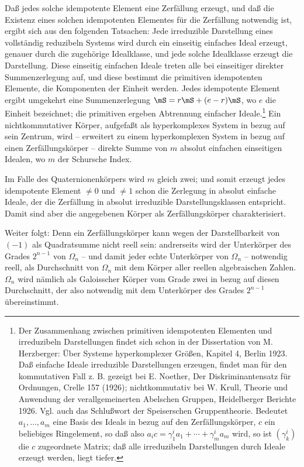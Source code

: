 Daß jedes solche idempotente Element eine Zerfällung erzeugt, und daß die Existenz eines solchen idempotenten Elementes für die Zerfällung notwendig ist, ergibt sich aus den folgenden Tatsachen: Jede irreduzible Darstellung eines vollständig reduzibeln Systems wird durch ein einseitig einfaches Ideal erzeugt, genauer durch die zugehörige Idealklasse, und jede solche Idealklasse erzeugt die Darstellung. Diese einseitig einfachen Ideale treten alle bei einseitiger direkter Summenzerlegung auf, und diese bestimmt die \guillemotright{}primitiven\guillemotleft{} idempotenten Elemente, die Komponenten der Einheit werden. Jedes idempotente Element ergibt umgekehrt eine Summenzerlegung $\mS=r\mS+(e-r)\mS$, wo $e$ die Einheit bezeichnet; die \guillemotright{}primitiven\guillemotleft{} ergeben Abtrennung einfacher Ideale.\footnote{Der Zusammenhang zwischen primitiven idempotenten Elementen und irreduzibeln Darstellungen findet sich schon in der Dissertation von M. Herzberger: Über Systeme hyperkomplexer Größen, Kapitel 4, Berlin 1923. Daß einfache Ideale irreduzible Darstellungen erzeugen, findet man für den kommutativen Fall z. B. gezeigt bei E. Noether, Der Diskriminantensatz für Ordnungen, Crelle 157 (1926); nichtkommutativ bei W. Krull, Theorie und Anwendung der verallgemeinerten Abelschen Gruppen, Heidelberger Berichte 1926. Vgl. auch das Schlußwort der Speiserschen Gruppentheorie. Bedeutet $a_1,\ldots,a_m$ eine Basis des Ideals in bezug auf den Zerfällungskörper, $c$ ein beliebiges Ringelement, so daß also $a_i c=\gamma^i_1 a_1+\cdots+\gamma^i_m a_m$ wird, so ist $(\gamma^i_k)$ die $c$ zugeordnete Matrix; daß alle irreduzibeln Darstellungen durch Ideale erzeugt werden, liegt tiefer.} Ein nichtkommutativer Körper, aufgefaßt als hyperkomplexes System in bezug auf sein Zentrum, wird -- erweitert zu einem hyperkomplexen System in bezug auf einen Zerfällungskörper -- direkte Summe von $m$ absolut einfachen einseitigen Idealen, wo $m$ der Schursche Index.

Im Falle des Quaternionenkörpers wird $m$ gleich zwei; und somit erzeugt jedes idempotente Element $\ne0$ und $\ne1$ schon die Zerlegung in absolut einfache Ideale, der die Zerfällung in absolut irreduzible Darstellungsklassen entspricht. Damit sind aber die angegebenen Körper als Zerfällungskörper charakterisiert.

Weiter folgt:  Denn ein Zerfällungskörper kann wegen der Darstellbarkeit von $(-1)$ als Quadratsumme nicht reell sein: andrerseits wird der Unterkörper des Grades $2^{n-1}$ von $\Omega_n$ -- und damit jeder echte Unterkörper von $\Omega_n$ -- notwendig reell, als Durchschnitt von $\Omega_n$ mit dem Körper aller reellen algebraischen Zahlen. $\Omega_n$ wird nämlich als Galoisscher Körper vom Grade zwei in bezug auf diesen Durchschnitt, der also notwendig mit dem Unterkörper des Grades $2^{n-1}$ übereinstimmt.

